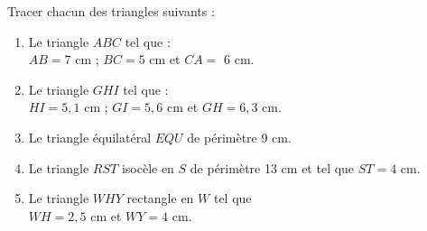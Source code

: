 \begin{exercice}
    Tracer chacun des triangles suivants :
    \begin{enumerate}
       \item Le triangle $ABC$ tel que : \\$AB =7$ cm ; $BC = 5$ cm et $CA =$ 6 cm.
       \item Le triangle $GHI$ tel que : \\$HI = 5,1$ cm ; $GI = 5,6$ cm et $GH = 6,3$ cm.
       \item Le triangle équilatéral $EQU$ de périmètre 9 cm.
       \item Le triangle $RST$ isocèle en $S$ de périmètre 13 cm et tel que $ST=4$ cm.
       \item Le triangle $WHY$ rectangle en $W$ tel que \\ $WH =2,5$ cm et $WY =4$ cm.
    \end{enumerate}

 \end{exercice}
